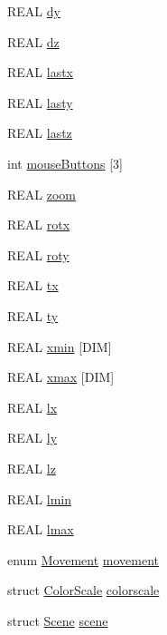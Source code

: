 \begin{CompactItemize}
\item 
REAL \hyperlink{namespaceGui_9f9c724776b5bb133fbb54fbbaad8b6b}{dy}
\item 
REAL \hyperlink{namespaceGui_08f884685f2bc61bf9ba9f3a20f809c5}{dz}
\item 
REAL \hyperlink{namespaceGui_67e596ec4c26da38c4c16edd4d3d8ffd}{lastx}
\item 
REAL \hyperlink{namespaceGui_0a1d9c5f437e332539fd6a9059ab2e54}{lasty}
\item 
REAL \hyperlink{namespaceGui_47745f43ef1ca3e88dc4afb80e7d2f7e}{lastz}
\item 
int \hyperlink{namespaceGui_b7fec0b981b38104f3b9843f86c30839}{mouseButtons} \mbox{[}3\mbox{]}
\item 
REAL \hyperlink{namespaceGui_0da4588637a3890172d5a43efb250048}{zoom}
\item 
REAL \hyperlink{namespaceGui_67c138887f5c4630c5afd040e7a5294c}{rotx}
\item 
REAL \hyperlink{namespaceGui_d638ed2f20a59ff6c2d2b1b6cf1de469}{roty}
\item 
REAL \hyperlink{namespaceGui_0d144586c178c9eb8a740d3209e83111}{tx}
\item 
REAL \hyperlink{namespaceGui_ae6dc6eb71aeb72299e638a67fe2d1bd}{ty}
\item 
REAL \hyperlink{namespaceGui_0dfb5583ee08d6cf807efcd9813cf4c5}{xmin} \mbox{[}DIM\mbox{]}
\item 
REAL \hyperlink{namespaceGui_93f1d37d2bd27e638d68895f5d264cbc}{xmax} \mbox{[}DIM\mbox{]}
\item 
REAL \hyperlink{namespaceGui_29647b3a241e0ba782e3be2e6e328af2}{lx}
\item 
REAL \hyperlink{namespaceGui_c2a7515d6f755bd934cf19d75e7bc4d1}{ly}
\item 
REAL \hyperlink{namespaceGui_c87eeee68e3d6a4915b6d18e10eeca8b}{lz}
\item 
REAL \hyperlink{namespaceGui_56c94fbda09f27d64aa2e60813b5c72f}{lmin}
\item 
REAL \hyperlink{namespaceGui_ac727ddae788cc92ec47a42a42c624c1}{lmax}
\item 
enum \hyperlink{namespaceGui_6c6dedfc7728e59d542346b9a44868fd}{Movement} \hyperlink{namespaceGui_993ed2a8e49cde7369fa3578802b851d}{movement}
\item 
struct \hyperlink{structGui_1_1ColorScale}{ColorScale} \hyperlink{namespaceGui_4701d367312756fbf7b5f1950665a65a}{colorscale}
\item 
struct \hyperlink{structGui_1_1Scene}{Scene} \hyperlink{namespaceGui_ad072e1325427d8e1fbd4d978bce6cf0}{scene}

\end{CompactItemize}
